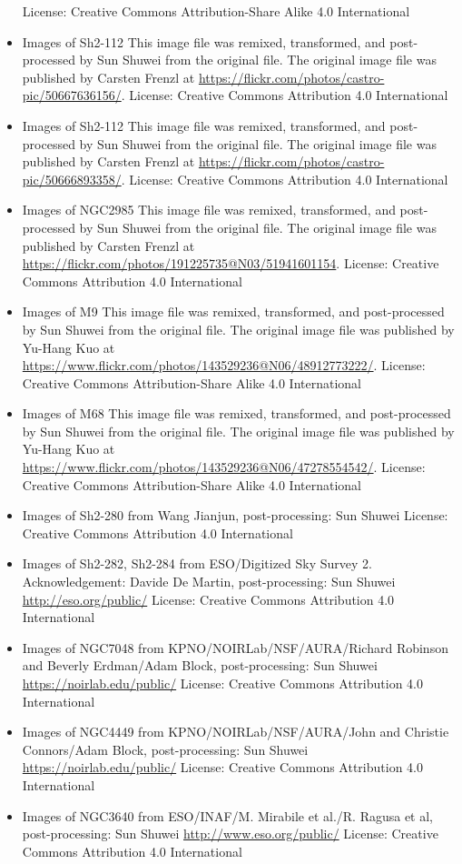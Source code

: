 \begin{itemize}
	 License: Creative Commons Attribution-Share Alike 4.0 International
\item Images of Sh2-112
	 This image file was remixed, transformed, and post-processed by Sun Shuwei from the original file. The original image file was published by Carsten Frenzl at \url{https://flickr.com/photos/castro-pic/50667636156/}.
	 License: Creative Commons Attribution 4.0 International
\item Images of Sh2-112
	 This image file was remixed, transformed, and post-processed by Sun Shuwei from the original file. The original image file was published by Carsten Frenzl at \url{https://flickr.com/photos/castro-pic/50666893358/}.
	 License: Creative Commons Attribution 4.0 International
\item Images of NGC2985
	 This image file was remixed, transformed, and post-processed by Sun Shuwei from the original file. The original image file was published by Carsten Frenzl at \url{https://flickr.com/photos/191225735@N03/51941601154}.
	 License: Creative Commons Attribution 4.0 International
\item Images of M9
	 This image file was remixed, transformed, and post-processed by Sun Shuwei from the original file. The original image file was published by Yu-Hang Kuo at \url{https://www.flickr.com/photos/143529236@N06/48912773222/}.
	 License: Creative Commons Attribution-Share Alike 4.0 International
\item Images of M68
	 This image file was remixed, transformed, and post-processed by Sun Shuwei from the original file. The original image file was published by Yu-Hang Kuo at \url{https://www.flickr.com/photos/143529236@N06/47278554542/}.
	 License: Creative Commons Attribution-Share Alike 4.0 International
\item Images of Sh2-280
	 from Wang Jianjun, post-processing: Sun Shuwei
	 License: Creative Commons Attribution 4.0 International
\item Images of Sh2-282, Sh2-284
	 from ESO/Digitized Sky Survey 2. Acknowledgement: Davide De Martin, post-processing: Sun Shuwei
	 \url{http://eso.org/public/}
	 License: Creative Commons Attribution 4.0 International
\item Images of NGC7048
	 from KPNO/NOIRLab/NSF/AURA/Richard Robinson and Beverly Erdman/Adam Block, post-processing: Sun Shuwei
	 \url{https://noirlab.edu/public/}
	 License: Creative Commons Attribution 4.0 International
\item Images of NGC4449
	 from KPNO/NOIRLab/NSF/AURA/John and Christie Connors/Adam Block, post-processing: Sun Shuwei
	 \url{https://noirlab.edu/public/}
	 License: Creative Commons Attribution 4.0 International
\item Images of NGC3640
	 from ESO/INAF/M. Mirabile et al./R. Ragusa et al, post-processing: Sun Shuwei
	 \url{http://www.eso.org/public/}
	 License: Creative Commons Attribution 4.0 International

\end{itemize}


